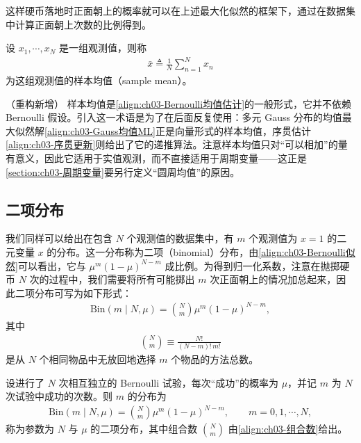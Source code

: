 \documentclass[../../main.tex]{subfiles}
\begin{document}
这样硬币落地时正面朝上的概率就可以在上述最大化似然的框架下，通过在数据集中计算正面朝上次数的比例得到。

\begin{definition}[样本均值]\label{definition:ch03-样本均值}
设 $x_1,\cdots,x_N$ 是一组观测值，则称
\begin{align}
\bar{x}\triangleq\frac{1}{N}\sum_{n=1}^{N}x_n
\label{align:ch03-样本均值}
\end{align}
为这组观测值的样本均值（sample mean）。
\end{definition}

\begin{remark}（重构新增）
样本均值是\eqref{align:ch03-Bernoulli均值估计}的一般形式，它并不依赖 Bernoulli 假设。引入这一术语是为了在后面反复使用：多元 Gauss 分布的均值最大似然解\eqref{align:ch03-Gauss均值ML}正是向量形式的样本均值，序贯估计\eqref{align:ch03-序贯更新}则给出了它的递推算法。注意样本均值只对“可以相加”的量有意义，因此它适用于实值观测，而不直接适用于周期变量——这正是\cref{section:ch03-周期变量}要另行定义“圆周均值”的原因。
\end{remark}

\subsection{二项分布}\label{subsection:ch03-二项分布}

我们同样可以给出在包含 $N$ 个观测值的数据集中，有 $m$ 个观测值为 $x=1$ 的二元变量 $x$ 的分布。这一分布称为二项（binomial）分布，由\cref{align:ch03-Bernoulli似然}可以看出，它与 $\mu^{m}(1-\mu)^{N-m}$ 成比例。为得到归一化系数，注意在抛掷硬币 $N$ 次的过程中，我们需要将所有可能掷出 $m$ 次正面朝上的情况加总起来，因此二项分布可写为如下形式：
\begin{align}
\mathrm{Bin}(m\mid N,\mu)=\binom{N}{m}\mu^{m}(1-\mu)^{N-m},
\label{align:ch03-二项分布}
\end{align}
其中
\begin{align}
\binom{N}{m}\equiv\frac{N!}{(N-m)!\,m!}
\label{align:ch03-组合数}
\end{align}
是从 $N$ 个相同物品中无放回地选择 $m$ 个物品的方法总数。

\begin{definition}[二项分布]\label{definition:ch03-二项分布}
设进行了 $N$ 次相互独立的 Bernoulli 试验，每次“成功”的概率为 $\mu$，并记 $m$ 为 $N$ 次试验中成功的次数。则 $m$ 的分布为
\begin{align*}
\mathrm{Bin}(m\mid N,\mu)=\binom{N}{m}\mu^{m}(1-\mu)^{N-m},\qquad m=0,1,\cdots,N,
\end{align*}
称为参数为 $N$ 与 $\mu$ 的二项分布，其中组合数 $\binom{N}{m}$ 由\eqref{align:ch03-组合数}给出。
\end{definition}
\end{document}
